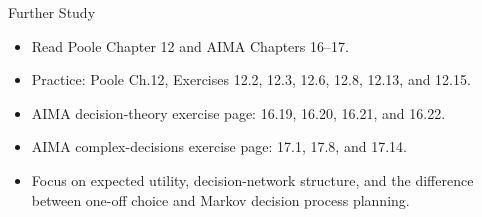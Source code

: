 \documentclass[aspectratio=169]{beamer}
\begin{document}
\begin{frame}{Further Study}
\begin{itemize}
  \item Read Poole Chapter 12 and AIMA Chapters 16--17.
  \item Practice: Poole Ch.12, Exercises 12.2, 12.3, 12.6, 12.8, 12.13, and 12.15.
  \item AIMA decision-theory exercise page: 16.19, 16.20, 16.21, and 16.22.
  \item AIMA complex-decisions exercise page: 17.1, 17.8, and 17.14.
  \item Focus on expected utility, decision-network structure, and the difference between one-off choice and Markov decision process planning.
\end{itemize}
\end{frame}
\end{document}
